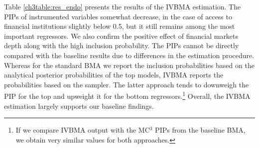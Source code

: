 \begin{refsection}
Table \ref{ch3table:res_endo} presents the results of the \ac{IVBMA} estimation. The \acp{PIP} of instrumented variables somewhat decrease, in the case of access to financial institutions slightly below 0.5, but it still remains among the most important regressors. We also confirm the positive effect of financial markets depth along with the high inclusion probability. The \acp{PIP} cannot be directly compared with the baseline results due to differences in the estimation procedure. Whereas for the standard \ac{BMA} we report the inclusion probabilities based on the analytical posterior probabilities of the top models, \ac{IVBMA} reports the probabilities based on the sampler. The latter approach tends to downweigh the \ac{PIP} for the top and upweight it for the bottom regressors.\footnote{If we compare \ac{IVBMA} output with the MC$^3$ \acp{PIP} from the baseline \ac{BMA}, we obtain very similar values for both approaches.} Overall, the \ac{IVBMA} estimation largely supports our baseline findings. 


\end{refsection}
